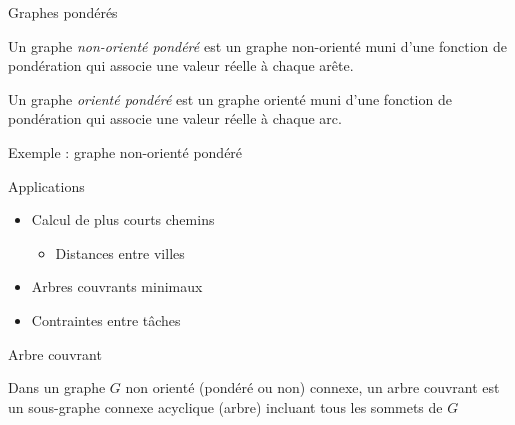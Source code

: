 
\begin{frame}{Graphes pondérés}

\begin{definition}
    Un graphe \emph{non-orienté pondéré} est un graphe non-orienté muni d'une fonction de pondération qui associe une valeur réelle à chaque arête. 
\end{definition}

\begin{definition}
    Un graphe \emph{orienté pondéré} est un graphe orienté muni d'une fonction de pondération qui associe une valeur réelle à chaque arc. 
\end{definition}

\end{frame}

\begin{frame}{Exemple : graphe non-orienté pondéré}
    \begin{center}
        
    \end{center}
    \end{frame}


\begin{frame}{Applications}
    \begin{itemize}
        \item Calcul de plus courts chemins 
        \begin{itemize}
            \item Distances entre villes
        \end{itemize}
        \item Arbres couvrants minimaux 
        \item Contraintes entre tâches 
    \end{itemize}
\end{frame}

\begin{frame}{Arbre couvrant}
    \begin{definition}
        Dans un graphe $G$ non orienté (pondéré ou non) connexe, un arbre couvrant est un sous-graphe connexe acyclique (arbre) incluant tous les sommets de $G$
    \end{definition}


\end{frame}



